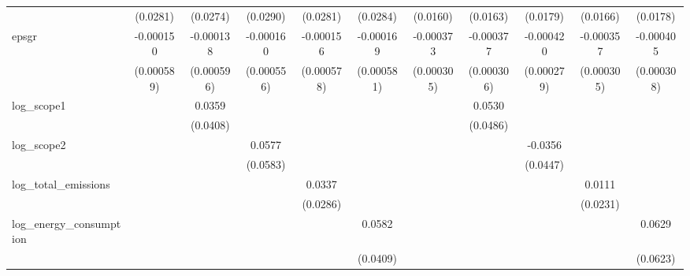 \begin{table}[htbp]
\begin{tabular}{l*{10}{c}}
                & (0.0281)         & (0.0274)         & (0.0290)         & (0.0281)         & (0.0284)         & (0.0160)         & (0.0163)         & (0.0179)         & (0.0166)         & (0.0178)         \\
[1em]
epsgr           &-0.000150         &-0.000138         &-0.000160         &-0.000156         &-0.000169         &-0.000373         &-0.000377         &-0.000420         &-0.000357         &-0.000405         \\
                &(0.000589)         &(0.000596)         &(0.000556)         &(0.000578)         &(0.000581)         &(0.000305)         &(0.000306)         &(0.000279)         &(0.000305)         &(0.000308)         \\
[1em]
log\_scope1      &                  &   0.0359         &                  &                  &                  &                  &   0.0530         &                  &                  &                  \\
                &                  & (0.0408)         &                  &                  &                  &                  & (0.0486)         &                  &                  &                  \\
[1em]
log\_scope2      &                  &                  &   0.0577         &                  &                  &                  &                  &  -0.0356         &                  &                  \\
                &                  &                  & (0.0583)         &                  &                  &                  &                  & (0.0447)         &                  &                  \\
[1em]
log\_total\_emissions&                  &                  &                  &   0.0337         &                  &                  &                  &                  &   0.0111         &                  \\
                &                  &                  &                  & (0.0286)         &                  &                  &                  &                  & (0.0231)         &                  \\
[1em]
log\_energy\_consumption&                  &                  &                  &                  &   0.0582         &                  &                  &                  &                  &   0.0629         \\
                &                  &                  &                  &                  & (0.0409)         &                  &                  &                  &                  & (0.0623)         \\

\end{tabular}
\end{table}
